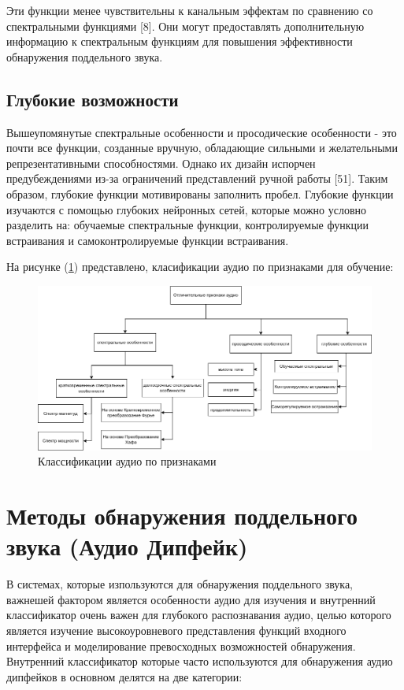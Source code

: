 Эти функции менее чувствительны к канальным эффектам по сравнению со спектральными функциями [8]. Они могут предоставлять дополнительную информацию к спектральным функциям для повышения эффективности обнаружения поддельного звука.

\section{Глубокие возможности}

Вышеупомянутые спектральные особенности и просодические особенности - это почти все функции, созданные вручную, обладающие сильными и желательными репрезентативными способностями. Однако их дизайн испорчен предубеждениями из-за ограничений представлений ручной работы [51]. Таким образом, глубокие функции мотивированы заполнить пробел. Глубокие функции изучаются с помощью глубоких нейронных сетей, которые можно условно разделить на: обучаемые спектральные функции, контролируемые функции встраивания и самоконтролируемые функции встраивания.

На рисунке (\ref{fig:audio-classification}) представлено, класификации аудио по признаками для обучение: 
\begin{figure}[H]
	\centering
	\includegraphics[width=0.9\linewidth]{images/classification-of-audio.png}
	\caption{Классификации аудио по признаками}
	\label{fig:audio-classification}
\end{figure}


\chapter{Методы обнаружения поддельного звука (Аудио Дипфейк)}

В системах, которые изпользуются для обнаружения поддельного звука, важнешей фактором является особенности аудио для изучения и внутренний классификатор очень важен для глубокого распознавания аудио, целью которого является изучение высокоуровневого представления функций входного интерфейса и моделирование превосходных возможностей обнаружения. Внутренний классификатор которые часто используются для обнаружения аудио дипфейков в основном делятся на две категории: 

